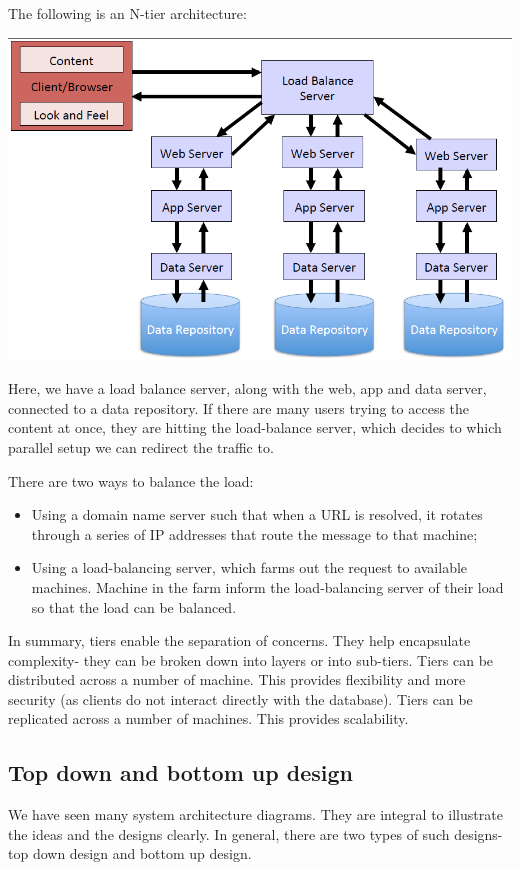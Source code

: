 \documentclass[a4paper, openany]{memoir}
\begin{document}
\noindent The following is an N-tier architecture:
\begin{center}
    \includegraphics[scale=0.5]{src/L8I2.PNG}
\end{center}
Here, we have a load balance server, along with the web, app and data server, connected to a data repository. If there are many users trying to access the content at once, they are hitting the load-balance server, which decides to which parallel setup we can redirect the traffic to.

\noindent There are two ways to balance the load:
\begin{itemize}
    \item Using a domain name server such that when a URL is resolved, it rotates through a series of IP addresses that route the message to that machine;
    \item Using a load-balancing server, which farms out the request to available machines. Machine in the farm inform the load-balancing server of their load so that the load can be balanced.
\end{itemize}

\noindent In summary, tiers enable the separation of concerns. They help encapsulate complexity- they can be broken down into layers or into sub-tiers. Tiers can be distributed across a number of machine. This provides flexibility and more security (as clients do not interact directly with the database). Tiers can be replicated across a number of machines. This provides scalability.

\subsection{Top down and bottom up design}
We have seen many system architecture diagrams. They are integral to illustrate the ideas and the designs clearly. In general, there are two types of such designs- top down design and bottom up design.
\end{document}
